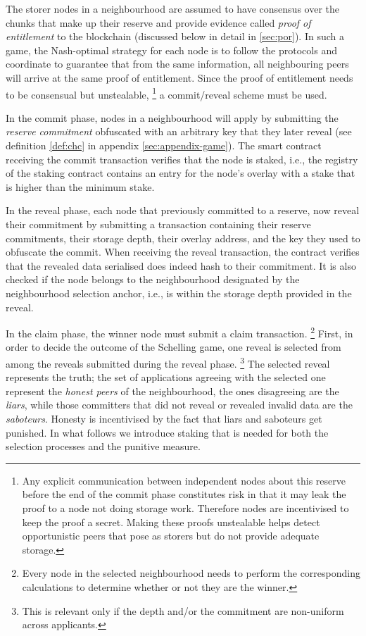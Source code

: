 The storer nodes in a neighbourhood are assumed to have  consensus over the chunks that make up their reserve and provide evidence called \emph{proof of entitlement} to the blockchain (discussed below in detail in \ref{sec:por}). In such a game, the Nash-optimal strategy for each node is to follow the protocols and coordinate to guarantee that from the same information, all neighbouring peers will arrive at the same proof of entitlement. Since the proof of entitlement needs to be consensual but unstealable,%
%
\footnote{%
Any explicit communication between independent nodes about this reserve before the end of the commit phase constitutes risk in that it may leak the proof to a node not doing storage work. Therefore nodes are incentivised to keep the proof a secret. Making these proofs unstealable helps detect opportunistic peers that pose as storers but do not provide adequate storage.}
%
a commit/reveal scheme must be used.

In the commit phase, nodes in a neighbourhood will apply by submitting the \emph{reserve commitment} obfuscated with an arbitrary key that they later reveal (see definition \ref{def:chc} in appendix \ref{sec:appendix-game}). The smart contract receiving the commit transaction verifies that the node is staked, i.e., the registry of the staking contract contains an entry for the node's overlay with a stake that is higher than the minimum stake.

In the reveal phase, each node that previously committed to a reserve, now reveal their commitment by submitting a transaction containing
their reserve commitments, their storage depth,
their overlay address, and the key they used to obfuscate  the commit.
When receiving the reveal transaction, the contract  verifies that the revealed data serialised does indeed hash to their commitment. It is also checked if the node belongs to the neighbourhood designated by the neighbourhood selection anchor, i.e., is within the storage depth provided in the reveal.

In the claim phase, the winner node must submit a claim transaction.%
%
\footnote{Every node in the selected neighbourhood needs to perform the corresponding calculations to determine whether or not they are the winner.}
%
First, in order to decide the outcome of the Schelling game, one reveal is selected  from among the reveals submitted during the reveal phase.%
%
\footnote{This is relevant only if the depth and/or the commitment are non-uniform across applicants.}
%
The selected reveal represents the truth; the set of applications agreeing with the selected one represent the \emph{honest peers} of the neighbourhood, the ones disagreeing are the \emph{liars}, while those committers that did not reveal or revealed invalid data are the \emph{saboteurs}. Honesty is incentivised by the fact that liars and saboteurs get punished. In what follows we introduce staking that is needed for both the selection processes and the punitive measure.


